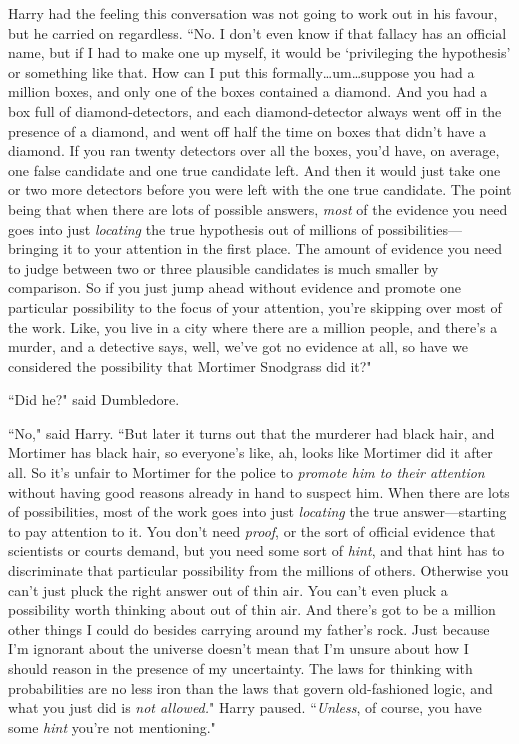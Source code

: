 Harry had the feeling this conversation was not going to work out in his favour, but he carried on regardless. ``No. I don't even know if that fallacy has an official name, but if I had to make one up myself, it would be `privileging the hypothesis' or something like that. How can I put this formally…um…suppose you had a million boxes, and only one of the boxes contained a diamond. And you had a box full of diamond-detectors, and each diamond-detector always went off in the presence of a diamond, and went off half the time on boxes that didn't have a diamond. If you ran twenty detectors over all the boxes, you'd have, on average, one false candidate and one true candidate left. And then it would just take one or two more detectors before you were left with the one true candidate. The point being that when there are lots of possible answers, \emph{most} of the evidence you need goes into just \emph{locating} the true hypothesis out of millions of possibilities—bringing it to your attention in the first place. The amount of evidence you need to judge between two or three plausible candidates is much smaller by comparison. So if you just jump ahead without evidence and promote one particular possibility to the focus of your attention, you're skipping over most of the work. Like, you live in a city where there are a million people, and there's a murder, and a detective says, well, we've got no evidence at all, so have we considered the possibility that Mortimer Snodgrass did it?"

``Did he?" said Dumbledore.

``No," said Harry. ``But later it turns out that the murderer had black hair, and Mortimer has black hair, so everyone's like, ah, looks like Mortimer did it after all. So it's unfair to Mortimer for the police to \emph{promote him to their attention} without having good reasons already in hand to suspect him. When there are lots of possibilities, most of the work goes into just \emph{locating} the true answer—starting to pay attention to it. You don't need \emph{proof}, or the sort of official evidence that scientists or courts demand, but you need some sort of \emph{hint}, and that hint has to discriminate that particular possibility from the millions of others. Otherwise you can't just pluck the right answer out of thin air. You can't even pluck a possibility worth thinking about out of thin air. And there's got to be a million other things I could do besides carrying around my father's rock. Just because I'm ignorant about the universe doesn't mean that I'm unsure about how I should reason in the presence of my uncertainty. The laws for thinking with probabilities are no less iron than the laws that govern old-fashioned logic, and what you just did is \emph{not allowed.}" Harry paused. ``\emph{Unless}, of course, you have some \emph{hint} you're not mentioning."

